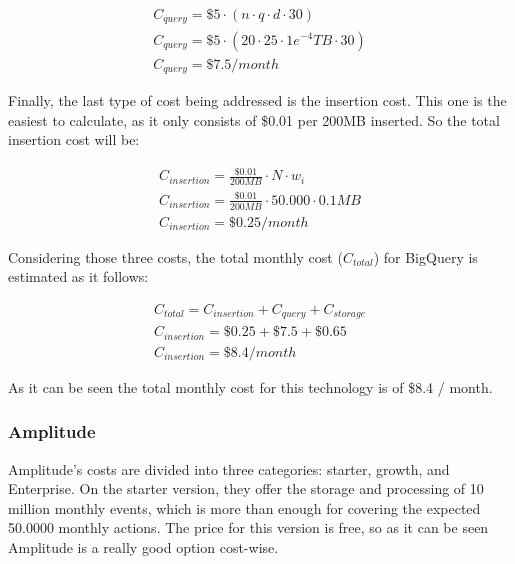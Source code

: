\documentclass[english, 12pt, a4paper, sci, utf8, a-1b, online]{aaltothesis}
\begin{document}
\begin{equation}
\begin{split}
    C_{query} = \$5 \cdot (n \cdot q \cdot d \cdot 30) \\
    C_{query} = \$5 \cdot (20 \cdot 25 \cdot 1e^{-4}TB \cdot 30)\\
    C_{query} = \$7.5 / month
\end{split}
\end{equation}

Finally, the last type of cost being addressed is the insertion cost. This one is the easiest to calculate, as it only consists of \$0.01 per 200MB inserted. So the total insertion cost will be:

\begin{equation}
\begin{split}
    C_{insertion} = \frac{\$0.01}{200MB} \cdot N \cdot w_i \\
    C_{insertion} = \frac{\$0.01}{200MB} \cdot 50.000 \cdot 0.1MB \\
    C_{insertion} = \$0.25 / month
\end{split}
\end{equation}

Considering those three costs, the total monthly cost ($C_{total}$) for BigQuery is estimated as it follows:

\begin{equation}
\begin{split}
    C_{total} = C_{insertion} + C_{query} + C_{storage}\\
    C_{insertion} = \$0.25 + \$7.5 +\$0.65\\
    C_{insertion} = \$8.4 / month
\end{split}
\end{equation}

As it can be seen the total monthly cost for this technology is of \$8.4 / month.

\subsubsection*{Amplitude}

Amplitude's costs are divided into three categories: starter, growth, and Enterprise. On the starter version, they offer the storage and processing of 10 million monthly events, which is more than enough for covering the expected 50.0000 monthly actions. The price for this version is free, so as it can be seen Amplitude is a really good option cost-wise.
\end{document}

